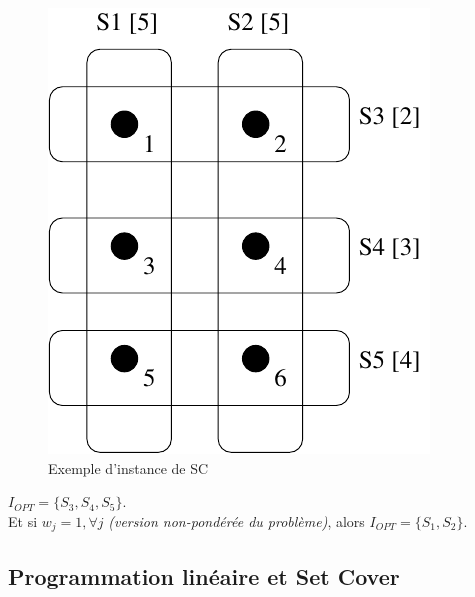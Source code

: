 \documentclass{article}
\newcommand{\titre}[1]{\textcolor{title}{#1}}
\begin{document}
\begin{sffamily}
\begin{figure}[h!]
    \begin{center}
    \includegraphics[scale=0.5]{inst_sc.pdf}
    \caption{Exemple d'instance de \titre{SC}}
    \end{center}	
\end{figure}

$I_{OPT} = \{S_3,S_4,S_5\}$. \\
\indent Et si $w_j = 1, \forall j$ \textit{(version non-pondérée du problème)}, alors $I_{OPT} = \{S_1,S_2\}$.

\subsection{Programmation linéaire et Set Cover}


\end{sffamily}
\end{document}
